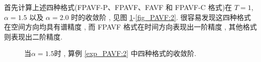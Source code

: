 	首先计算上述四种格式(FPAVF-P、FPAVF、FAVF 和 FPAVF-C 格式)在 $T=1$, $\alpha=1.5$ 以及 $\alpha=2.0$  时的收敛阶 , 见图 \ref{fig_PAVF:1}-\ref{fig_PAVF:2}.
	很容易发现这四种格式在空间方向均具有谱精度 , 而 FPAVF 格式在时间方向表现出一阶精度 , 其他格式则表现出二阶精度.
	
	\begin{figure}[H]
		\begin{center}
		\caption{当$\alpha=1.5$时 , 算例 \ref{exp_PAVF:2}  中四种格式的收敛阶.}
		 \label{fig_PAVF:1}
		\end{center}
		\end{figure}
		
